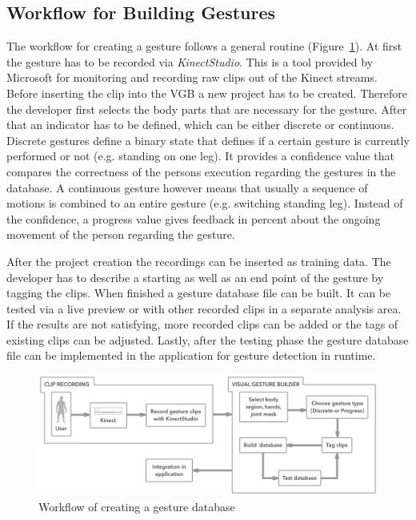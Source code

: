 \subsection{Workflow for Building Gestures }
The workflow for creating a gesture follows a general routine (Figure~\ref{fig:5_3_gestureCreation}).
At first the gesture has to be recorded via \textit{KinectStudio}.
This is a tool provided by Microsoft for monitoring and recording raw clips out of the Kinect streams.
Before inserting the clip into the VGB a new project has to be created.
Therefore the developer first selects the body parts that are necessary for the gesture.
After that an indicator has to be defined, which can be either discrete or continuous.
Discrete gestures define a binary state that defines if a certain gesture is currently performed or not (e.g. standing on one leg).
It provides a confidence value that compares the correctness of the persons execution regarding the gestures in the database.
A continuous gesture however means that usually a sequence of motions is combined to an entire gesture (e.g. switching standing leg).
Instead of the confidence, a progress value gives feedback in percent about the ongoing movement of the person regarding the gesture.

After the project creation the recordings can be inserted as training data.
The developer has to describe a starting as well as an end point of the gesture by tagging the clips.
When finished a gesture database file can be built.
It can be tested via a live preview or with other recorded clips in a separate analysis area.
If the results are not satisfying, more recorded clips can be added or the tags of existing clips can be adjusted.
Lastly, after the testing phase the gesture database file can be implemented in the application for gesture detection in runtime. %
\begin{figure}[htb]
	\centering
	\begin{minipage}[t]{1\linewidth}
		\centering
		\includegraphics[width=1\linewidth]{Pictures/5_3_gestureCreation}
		\caption{Workflow of creating a gesture database}
		\label{fig:5_3_gestureCreation}
	\end{minipage}
\end{figure}